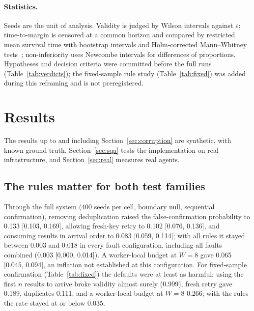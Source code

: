 \documentclass[pdflatex,sn-mathphys-num]{sn-jnl}
\theoremstyle{thmstyleone}
\theoremstyle{thmstyletwo}
\theoremstyle{thmstylethree}
\begin{document}
\paragraph{Statistics.} Seeds are the unit of analysis. Validity is judged by Wilson intervals against $\varepsilon$; time-to-margin is censored at a common horizon and compared by restricted mean survival time with bootstrap intervals and Holm-corrected Mann--Whitney tests~\cite{kaplan1958}; non-inferiority uses Newcombe intervals for differences of proportions. Hypotheses and decision criteria were committed before the full runs (Table~\ref{tab:verdicts}); the fixed-sample rule study (Table~\ref{tab:fixed}) was added during this reframing and is not preregistered.

\section{Results}\label{sec:results}
The results up to and including Section~\ref{sec:corruption} are synthetic, with known ground truth. Section~\ref{sec:sqa} tests the implementation on real infrastructure, and Section~\ref{sec:real} measures real agents.

\subsection{The rules matter for both test families}
Through the full system (400 seeds per cell, boundary null, sequential confirmation), removing deduplication raised the false-confirmation probability to 0.133 [0.103, 0.169], allowing fresh-key retry to 0.102 [0.076, 0.136], and consuming results in arrival order to 0.083 [0.059, 0.114]; with all rules it stayed between 0.003 and 0.018 in every fault configuration, including all faults combined (0.003 [0.000, 0.014]). A worker-local budget at $W=8$ gave 0.065 [0.045, 0.094], an inflation not established at this configuration. For fixed-sample confirmation (Table~\ref{tab:fixed}) the defaults were at least as harmful: using the first $n$ results to arrive broke validity almost surely (0.999), fresh retry gave 0.189, duplicates 0.111, and a worker-local budget at $W=8$ 0.266; with the rules the rate stayed at or below 0.035.
\end{document}
